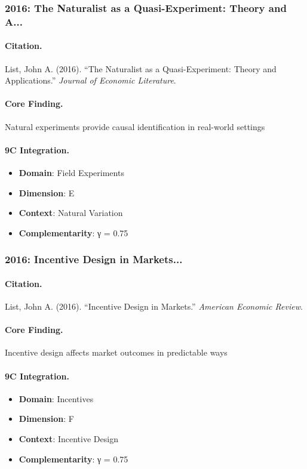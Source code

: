 \subsubsection{2016: The Naturalist as a Quasi-Experiment: Theory and A...}

\paragraph{Citation.}
List, John A. (2016). ``The Naturalist as a Quasi-Experiment: Theory and Applications.''
\textit{Journal of Economic Literature}.

\paragraph{Core Finding.}
Natural experiments provide causal identification in real-world settings

\paragraph{9C Integration.}
\begin{itemize}[nosep]
  \item \textbf{Domain}: Field Experiments
  \item \textbf{Dimension}: E
  \item \textbf{Context}: Natural Variation
  \item \textbf{Complementarity}: γ = 0.75
\end{itemize}


\subsubsection{2016: Incentive Design in Markets...}

\paragraph{Citation.}
List, John A. (2016). ``Incentive Design in Markets.''
\textit{American Economic Review}.

\paragraph{Core Finding.}
Incentive design affects market outcomes in predictable ways

\paragraph{9C Integration.}
\begin{itemize}[nosep]
  \item \textbf{Domain}: Incentives
  \item \textbf{Dimension}: F
  \item \textbf{Context}: Incentive Design
  \item \textbf{Complementarity}: γ = 0.75
\end{itemize}



